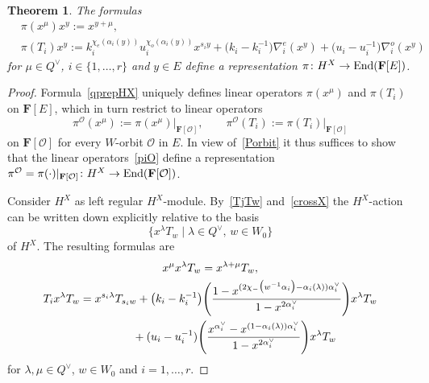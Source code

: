 \documentclass[pdftex]{sigma}
\numberwithin{equation}{section}
\newtheorem{Theorem}{Theorem}[section]
\begin{document}
\begin{Theorem}\label{theoremH}
The formulas
\begin{align}
&\pi(x^\mu)x^y:=x^{y+\mu},\nonumber\\
&\pi(T_i)x^y:=k_i^{\chi_e(\alpha_i(y))}u_i^{\chi_o(\alpha_i(y))}x^{s_iy}+\bigl(k_i-k_i^{-1}\bigr)\nabla_i^e(x^y)+\bigl(u_i-u_i^{-1}\bigr)\nabla_i^o(x^y)\label{qprepHX}
\end{align}
for $\mu\in Q^\vee$, $i\in\{1,\dots,r\}$ and $y\in E$
define a representation $\pi\colon H^X\rightarrow\textup{End}(\mathbf{F}[E])$.
\end{Theorem}
\begin{proof}
Formula~\eqref{qprepHX} uniquely defines linear operators $\pi(x^\mu)$ and $\pi(T_i)$ on $\mathbf{F}[E]$, which in turn restrict to linear operators
\begin{equation}\label{piO}
\pi^{\mathcal{O}}(x^\mu):=\pi(x^\mu)\vert_{\mathbf{F}[\mathcal{O}]},\qquad \pi^{\mathcal{O}}(T_i):=\pi(T_i)\vert_{\mathbf{F}[\mathcal{O}]}
\end{equation}
on $\mathbf{F}[\mathcal{O}]$ for every $W$-orbit $\mathcal{O}$ in $E$. In view of~\eqref{Porbit} it thus suffices to show that the linear operators~\eqref{piO} define a representation $\pi^{\mathcal{O}}=\pi(\cdot)\vert_{\mathbf{F}[\mathcal{O}]}\colon H^X\rightarrow\textup{End}(\mathbf{F}[\mathcal{O}])$.

Consider $H^X$ as left regular $H^X$-module. By~\eqref{TjTw} and~\eqref{crossX} the $H^X$-action can be written down explicitly relative to the basis
\[
\bigl\{x^\lambda T_w\mid \lambda\in Q^\vee,\, w\in W_0\bigr\}
\]
of $H^X$. The resulting formulas are
\begin{gather}
x^\mu x^\lambda T_w=x^{\lambda+\mu}T_w,\nonumber\\
T_ix^\lambda T_w=x^{s_i\lambda}T_{s_iw}+\bigl(k_i-k_i^{-1}\bigr)\Biggl(\frac{1-x^{(2\chi_-\bigl(w^{-1}\alpha_i\bigr)-\alpha_i(\lambda))\alpha_i^\vee}}{1-x^{2\alpha_i^\vee}}\Biggr)x^\lambda T_w\nonumber\\
\hphantom{T_ix^\lambda T_w=}{}
+(u_i-u_i^{-1})\Biggl(\frac{x^{\alpha_i^\vee}-x^{(1-\alpha_i(\lambda))\alpha_i^\vee}}{1-x^{2\alpha_i^\vee}}\Biggr)x^{\lambda}T_w
\label{regularHX}
\end{gather}
for $\lambda,\mu\in Q^\vee$, $w\in W_0$ and $i=1,\dots,r$.


\end{proof}
\end{document}
